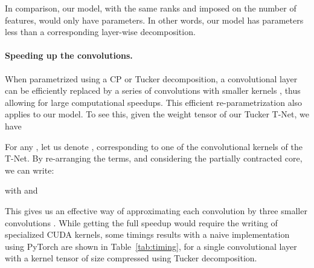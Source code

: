 \documentclass[10pt,twocolumn,letterpaper]{article}
\begin{document}
In comparison, our model, with the same ranks  and  imposed on the number of features, would only have  parameters. In other words, our model has  parameters less than a corresponding layer-wise decomposition.

\paragraph{Speeding up the convolutions.} When parametrized using a CP or Tucker decomposition, a convolutional layer can be efficiently replaced by a series of convolutions with smaller kernels \cite{lebedev2014speeding,yong2015compression}, thus allowing for large computational speedups. This efficient re-parametrization also applies to our model. To see this, given the weight tensor  of our Tucker T-Net, we have


For any , let us denote  
, corresponding to one of the convolutional kernels of the T-Net. By re-arranging the terms, and considering the partially contracted core, we can write: 

with  and

This gives us an effective way of approximating each convolution by three smaller convolutions \cite{yong2015compression}. While getting the full speedup would require the writing of specialized CUDA kernels, some timings results with a naive implementation using PyTorch are shown in Table~\ref{tab:timing}, for a single convolutional layer with a kernel tensor of size  compressed using Tucker decomposition.
\end{document}
